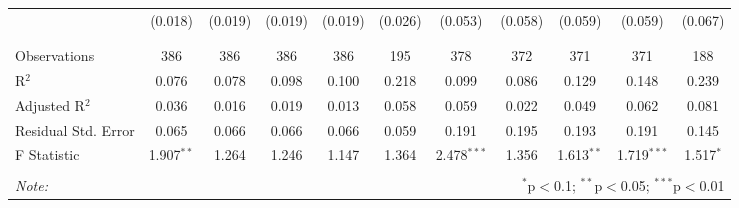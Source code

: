 \begin{table}[H]
\begin{tabular}{@{\extracolsep{4pt}}lcccccccccc}
  & (0.018) & (0.019) & (0.019) & (0.019) & (0.026) & (0.053) & (0.058) & (0.059) & (0.059) & (0.067) \\ 
  & & & & & & & & & & \\ 
\hline \\[-1.8ex] 
Observations & 386 & 386 & 386 & 386 & 195 & 378 & 372 & 371 & 371 & 188 \\ 
R$^{2}$ & 0.076 & 0.078 & 0.098 & 0.100 & 0.218 & 0.099 & 0.086 & 0.129 & 0.148 & 0.239 \\ 
Adjusted R$^{2}$ & 0.036 & 0.016 & 0.019 & 0.013 & 0.058 & 0.059 & 0.022 & 0.049 & 0.062 & 0.081 \\ 
Residual Std. Error & 0.065 & 0.066 & 0.066 & 0.066 & 0.059 & 0.191 & 0.195 & 0.193 & 0.191 & 0.145 \\ 
F Statistic & 1.907$^{**}$ & 1.264 & 1.246 & 1.147 & 1.364 & 2.478$^{***}$ & 1.356 & 1.613$^{**}$ & 1.719$^{***}$ & 1.517$^{*}$ \\ 
\hline 
\hline \\[-1.8ex] 
\textit{Note:}  & \multicolumn{10}{r}{$^{*}$p$<$0.1; $^{**}$p$<$0.05; $^{***}$p$<$0.01} \\ 
\end{tabular} 
\end{table} 
